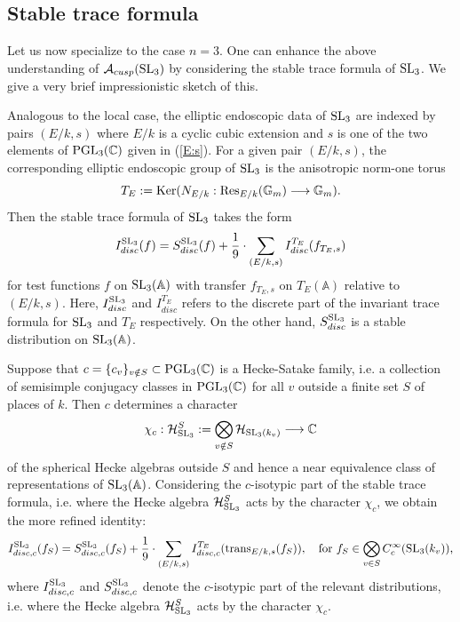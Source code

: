 \documentclass[11pt]{amsart}
\theoremstyle{plain}
\numberwithin{equation}{section}
\newcommand{\C}{\mathbb C}
\newcommand{\A}{\mathbb A}
\def\SL{{\rm SL}}
\def\PGL{{\rm PGL}}
\def\A{{\mathbb A}}
\def\C{{\bf C}}
\def\C{{\mathbb C}}
\begin{document}
\vskip 10pt

\subsection{\bf Stable trace formula}
Let us now specialize to the case $n=3$.
One can enhance the above understanding of $\mathcal{A}_{cusp}(\SL_3)$ by considering the  stable trace formula of $\SL_3$. We give a very brief impressionistic sketch of this. 
\vskip 5pt


Analogous to the local case, the elliptic endoscopic data of $\SL_3$ are indexed by pairs $(E/k, s)$ where $E/k$ is a cyclic cubic extension and $s$ is one of the two elements of $\PGL_3(\C)$ given in (\ref{E:s}).
For a given pair $(E/k,s)$, the corresponding elliptic endoscopic group of $\SL_3$  is the anisotropic norm-one  torus
\[ T_E := {\rm Ker}( N_{E/k}: {\rm Res}_{E/k}(\mathbb{G}_m)\longrightarrow \mathbb{G}_m).\]
 Then the stable trace formula of $\SL_3$ takes the form
\[  
I^{\SL_3}_{disc} (f) =   S_{disc}^{\SL_3}(f)   + \frac{1}{9} \cdot \sum_{(E/k,s)}  I_{disc}^{T_E} ( f_{T_E,s}) \]
for test functions $f$ on $\SL_3(\A)$ with transfer $f_{T_E,s}$ on $T_E(\A)$ relative to $(E/k,s)$.  Here, $I_{disc}^{\SL_3}$ and $I_{disc}^{T_E}$ refers to the discrete part of the invariant trace formula for $\SL_3$ and $T_E$ respectively. On the other hand, $S_{disc}^{\SL_3}$ is a stable distribution on $\SL_3(\A)$. 
\vskip 5pt


Suppose that $c = \{ c_v \}_{v \notin S} \subset \PGL_3(\C)$ is a Hecke-Satake family, i.e. a collection of semisimple conjugacy classes in  $\PGL_3(\C)$ for all $v$ outside a finite set $S$ of places of $k$. Then $c$ determines a character 
\[   \chi_c:  \mathcal{H}_{\SL_3}^S:= \bigotimes_{v \notin S} \mathcal{H}_{\SL_3(k_v)} \longrightarrow \C \]
of the spherical Hecke algebras outside  $S$ and hence a near equivalence class of representations of $\SL_3(\A)$. 
Considering the $c$-isotypic part of the stable trace formula, i.e. where the Hecke algebra $\mathcal{H}_{\SL_3}^S$ acts by the character $\chi_c$, we obtain the more refined identity:
\[  I_{disc,c }^{\SL_3} (f_S)   = S_{disc,c}^{\SL_3}(f_S)  +  \frac{1}{9} \cdot \sum_{(E/k,s)}  I_{disc,c}^{T_E} ( {\rm trans}_{E/k,s}(f_S)),   \quad \text{for $f_S \in \bigotimes_{v \in S} C^{\infty}_c(\SL_3(k_v))$,} 
\]
where $I_{disc,c }^{\SL_3}$ and $S_{disc,c}^{\SL_3}$ denote the $c$-isotypic part of the relevant distributions, i.e. where the Hecke algebra $\mathcal{H}_{\SL_3}^S$ acts by the character $\chi_c$.
 
\end{document}
